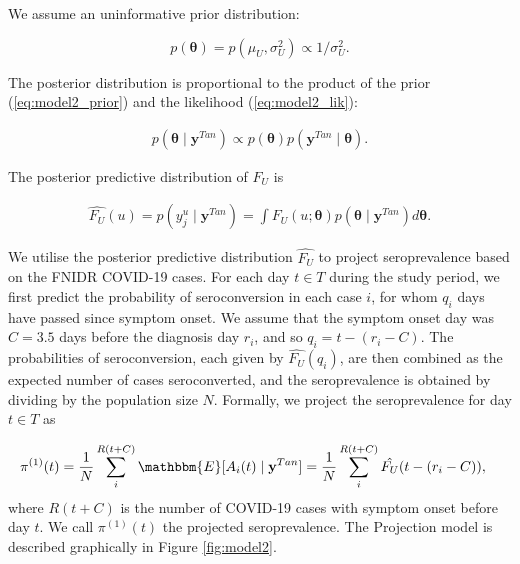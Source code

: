 \documentclass[aoas]{imsart}
\begin{document}
We assume an uninformative prior distribution:

\begin{equation}\label{eq:model2_prior}
p(\mathbf{\theta}) = p(\mu_U, \sigma_U^2) \propto 1 / \sigma_U^2.
\end{equation}

The posterior distribution is proportional to the product of the prior (\ref{eq:model2_prior}) and the likelihood (\ref{eq:model2_lik}):

\begin{equation}\label{eq:model2_post}
\begin{split}
p(\mathbf{\theta} \mid \mathbf{y}^{Tan}) \propto p(\mathbf{\theta}) p(\mathbf{y}^{Tan}\mid \mathbf{\theta}).
\end{split}
\end{equation}

The posterior predictive distribution of $F_U$ is 

\begin{equation}\label{eq:model2_postpred}
\begin{split}
\hat {F_U}(u) = p(y_j^u \mid \mathbf{y}^{Tan}) = \int F_U(u; \mathbf{\theta}) p(\mathbf{\theta} \mid \mathbf{y}^{Tan}) d \mathbf{\theta}.
\end{split}
\end{equation}


We utilise the posterior predictive distribution $\hat {F_U}$ to project seroprevalence based on the FNIDR COVID-19 cases. For each day $t \in T$ during the study period, we first predict the probability of seroconversion in each case $i$, for whom $q_i$ days have passed since symptom onset. We assume that the symptom onset day was $C = 3.5$ days before the diagnosis day $r_i$, and so $q_i = t - (r_i - C)$. The probabilities of seroconversion, each given by $\hat {F_U}(q_i)$, are then combined as the expected number of cases seroconverted, and the seroprevalence is obtained by dividing by the population size $N$. Formally, we project the seroprevalence for day $t \in T$ as

\begin{equation}\label{eq:projection}
\begin{split}
\pi^{(1)}(t) 
&= \frac{1}{N} \sum_i^{R(t + C)} \mathbbm{E}[A_i(t) \mid \mathbf{y}^{Tan}] 
=  \frac{1}{N} \sum_i^{R(t + C)} \hat {F_U}(t - (r_i - C)),
\end{split}
\end{equation}
where $R(t + C)$ is the number of COVID-19 cases with symptom onset before day $t$. We call $\pi^{(1)}(t)$ the projected seroprevalence. The Projection model is described graphically in Figure \ref{fig:model2}.
\end{document}
